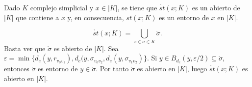 \documentclass[HS.tex]{subfiles}
\begin{document}
\begin{prop}
Dado $K$ complejo simplicial y $x\in|K|$, se tiene que $\mathring{st}(x;K)$ es un abierto de $|K|$ que contiene a $x$ y, en consecuencia, $st(x;K)$ es un entorno de $x$ en $|K|$.
\end{prop}
\begin{dem}
\[
\mathring{st}(x;K)=\bigcup_{x\in \sigma\in K}\mathring{\sigma}.
\]
Basta ver que $\mathring{\sigma}$ es abierto de $|K|$. Sea $\varepsilon=\min\{d_e(y,r_{v_0v_1}),d_e(y,\sigma_{v_0v_2},d_e(y,\sigma_{v_1v_2})\}$. Si $y\in B_{d_e}(y,\varepsilon/2)\subseteq \mathring{\sigma}$, entonces $\mathring{\sigma}$ es entorno de $y\in\mathring{\sigma}$. Por tanto $\mathring{\sigma}$ es abierto en $|K|$, luego $\mathring{st}(x;K)$ es abierto en $|K|$. 
\QED
\end{dem}
\end{document}
